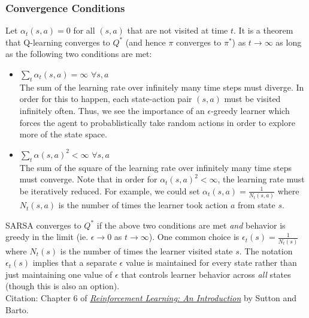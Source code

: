 \subsubsection{Convergence Conditions}
Let $\alpha_t(s, a) = 0$ for all $(s, a)$ that are not visited at time $t$. It is a theorem that Q-learning converges to $Q^*$ (and hence $\pi$ converges to $\pi^*$) as $t \rightarrow \infty$ as long as the following two conditions are met:
\begin{itemize}
    \item $\sum_t\alpha_t(s, a) = \infty$ $\forall s, a$\\
    The sum of the learning rate over infinitely many time steps must diverge. In order for this to happen, each state-action pair $(s, a)$ must be visited infinitely often. Thus, we see the importance of an $\epsilon$-greedy learner which forces the agent to probablistically take random actions in order to explore more of the state space.
    \item $\sum_t\alpha(s, a)^2 < \infty$ $\forall s, a$\\
    The sum of the square of the learning rate over infinitely many time steps must converge. Note that in order for $\alpha_t(s, a)^2 < \infty$, the learning rate must be iteratively reduced. For example, we could set $\alpha_t(s, a) = \frac{1}{N_t(s, a)}$ where $N_t(s, a)$ is the number of times the learner took action $a$ from state $s$.
\end{itemize}
SARSA converges to $Q^*$ if the above two conditions are met \textit{and} behavior is greedy in the limit (ie. $\epsilon \rightarrow 0$ as $t \rightarrow \infty$). One common choice is $\epsilon_t(s) = \frac{1}{N_t(s)}$ where $N_t(s)$ is the number of times the learner visited state $s$. The notation $\epsilon_t(s)$ implies that a separate $\epsilon$ value is maintained for every state rather than just maintaining one value of $\epsilon$ that controls learner behavior across \textit{all} states (though this is also an option).\\

\noindent Citation: Chapter 6 of \href{http://incompleteideas.net/book/RLbook2020.pdf}{\textit{Reinforcement Learning: An Introduction}} by Sutton and Barto.
